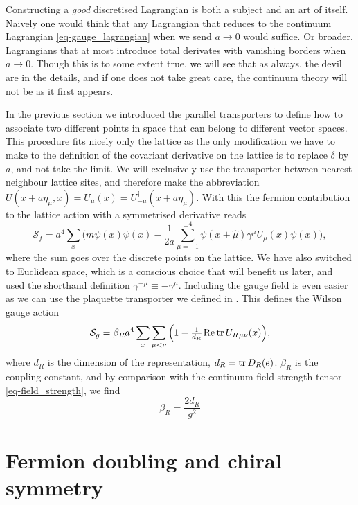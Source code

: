 Constructing a \emph{good} discretised Lagrangian is both a subject and an art
of itself. Naively one would think that any Lagrangian that reduces to the
continuum Lagrangian \eqref{eq-gauge_lagrangian} when we send $a \to 0$ would
suffice. Or broader, Lagrangians that at most introduce total derivates with 
vanishing borders when $a \to 0$. Though this is to some extent true, we will
see that as always, the devil are in the details, and if one does not take great
care, the continuum theory will not be as it first appears.

In the previous section we introduced the parallel transporters to define how to
associate two different points in space that can belong to different vector
spaces. This procedure fits nicely only the lattice as the only modification we
have to make to the definition of the covariant derivative on the lattice is to
replace $\delta$ by $a$, and not take the limit. We will exclusively use the
transporter between nearest neighbour lattice sites, and therefore make the
abbreviation $U(x + a \eta_\mu, x) = U_{\mu}(x) =
U_{-\mu}^{\dagger}(x+a\eta_{\mu})$. With this the fermion contribution to the
lattice action with a symmetrised derivative reads
%
\begin{equation} \label{eq-naive_fermions}
  \mathcal{S}_f = a^4 \sum_x \Big( 
    m \bar{\psi}(x)\psi(x) - 
    \frac{1}{2a}\sum_{\mu=\pm 1}^{\pm 4}
    \bar{\psi}(x+\hat{\mu})\gamma^{\mu}U_{\mu}(x) \psi(x) \bigg),
\end{equation}
%
where the sum goes over the discrete points on the lattice. We have also
switched to Euclidean space, which is a conscious choice that will benefit us
later, and used the shorthand definition $\gamma^{-\mu} \equiv -\gamma^{\mu}$.
Including the gauge field is even easier as we can use the plaquette transporter
we defined in . This defines the Wilson gauge
action
%
\begin{equation}
  \mathcal{S}_g = \beta_R a^4 \sum_x \sum_{\mu < \nu} \Big( 1 -
    \textstyle\frac{1}{d_R} \hskip.2ex \text{Re} \operatorname{tr} U_{R \hskip.2ex\mu\nu}(x) \Big),
\end{equation}
%
where $d_R$ is the dimension of the representation, $d_R = \operatorname{tr} D_R(e)$. $\beta_R$ is the
coupling constant, and by comparison with the continuum field strength tensor
\eqref{eq-field_strength}, we find
%
\begin{equation}
  \beta_R = \frac{2 d_R}{g^2}
\end{equation}

\section{Fermion doubling and chiral symmetry} \label{sec-fermion_doubling}

